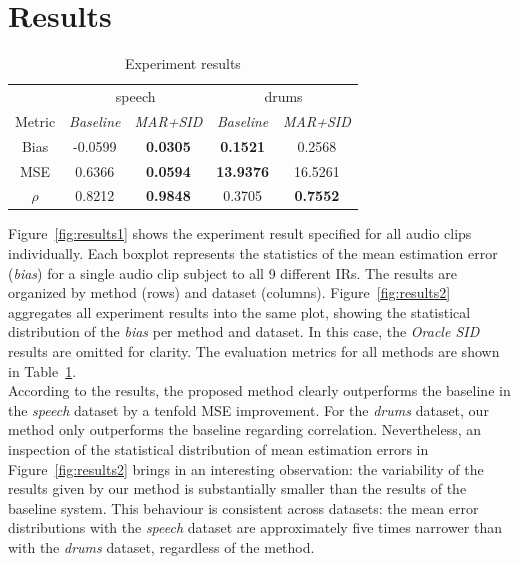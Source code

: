 \section{Results}
\label{sec:results}

\begin{table}[t]
\caption{Experiment results}
\begin{center}
\begin{tabular}{ccccc}
\toprule
 & \multicolumn{2}{c}{speech} & \multicolumn{2}{c}{drums} \\
Metric & \textit{Baseline}&\textit{MAR+SID}&\textit{Baseline}&\textit{MAR+SID}\\
\midrule
Bias  & -0.0599    & \textbf{0.0305}   & \textbf{0.1521}     & 0.2568   \\
MSE   & 0.6366     & \textbf{0.0594}   & \textbf{13.9376}    & 16.5261  \\
$\rho$ & 0.8212    &\textbf{ 0.9848}   & 0.3705    			 & \textbf{0.7552}  \\ 
\hline
\end{tabular}
\label{tab:results}
\end{center}
\end{table}


Figure~\ref{fig:results1} shows the experiment result specified for all audio clips individually. Each boxplot represents the statistics of the mean estimation error (\textit{bias}) for a single audio clip subject to all 9 different IRs. The results are organized by method (rows) and dataset (columns). 
Figure~\ref{fig:results2} aggregates all experiment results into the same plot, showing the statistical distribution of the \textit{bias} per method and dataset. In this case, the \textit{Oracle SID} results are omitted for clarity.
The evaluation metrics for all methods are shown in Table~\ref{tab:results}.\\

According to the results, the proposed method clearly outperforms the baseline in the \textit{speech} dataset by a tenfold MSE improvement. For the \textit{drums} dataset, our method only outperforms the baseline regarding correlation. 
Nevertheless, an inspection of the statistical distribution of mean estimation errors in Figure~\ref{fig:results2} brings in an interesting observation: 
the variability of the results given by our method is substantially smaller than the results of the baseline system. This behaviour is consistent across datasets: the mean error distributions with the \textit{speech} dataset are approximately five times narrower than with the \textit{drums} dataset, regardless of the method. \\

